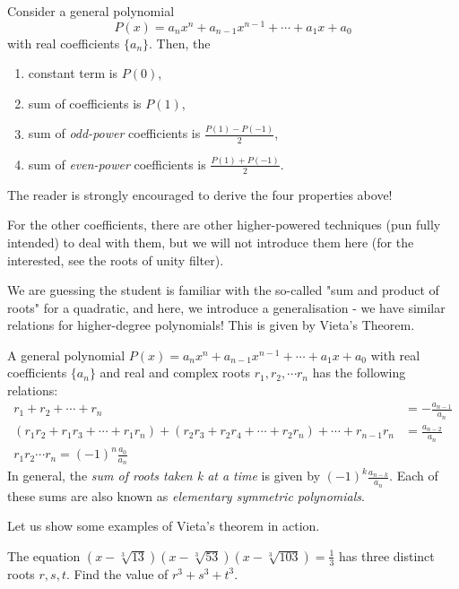\documentclass[../main.tex]{subfiles}
\begin{document}
Consider a general polynomial $$P(x)=a_nx^n+a_{n-1}x^{n-1}+\cdots+a_1x+a_0$$ with real coefficients $\{a_n\}$. Then, the
\begin{enumerate}
    \item constant term is $P(0)$,
    \item sum of coefficients is $P(1)$,
    \item sum of \textit{odd-power} coefficients is $\frac{P(1)-P(-1)}{2}$,
    \item sum of \textit{even-power} coefficients is $\frac{P(1)+P(-1)}{2}$.
\end{enumerate}

The reader is strongly encouraged to derive the four properties above!

For the other coefficients, there are other higher-powered techniques (pun fully intended) to deal with them, but we will not introduce them here (for the interested, see the roots of unity filter).

We are guessing the student is familiar with the so-called "sum and product of roots" for a quadratic, and here, we introduce a generalisation - we have similar relations for higher-degree polynomials! This is given by Vieta's Theorem.

\begin{proposition}
    A general polynomial $P(x)=a_nx^n+a_{n-1}x^{n-1}+\cdots+a_1x+a_0$ with real coefficients $\{a_n\}$ and real and complex roots $r_1, r_2, \cdots r_n$ has the following relations:
    \begin{align*}
        r_1+r_2+\cdots+r_n&=-\frac{a_{n-1}}{a_n}\\
        (r_1r_2+r_1r_3+\cdots+r_1r_n)+(r_2r_3+r_2r_4+\cdots+r_2r_n)+\cdots+r_{n-1}r_n&=\frac{a_{n-2}}{a_n} \\
        r_1r_2\cdots r_n=(-1)^n\frac{a_0}{a_n}
    \end{align*}
    In general, the \textit{sum of roots taken k at a time} is given by $(-1)^k\frac{a_{n-k}}{a_n}.$ Each of these sums are also known as \textit{elementary symmetric polynomials}.
\end{proposition}

Let us show some examples of Vieta's theorem in action. 
\begin{example}
    The equation $(x-\sqrt[3]{13})(x-\sqrt[3]{53})(x-\sqrt[3]{103})=\frac{1}{3}$ has three distinct roots $r,s,t$. Find the value of $r^3+s^3+t^3$.
\end{example}
\end{document}
